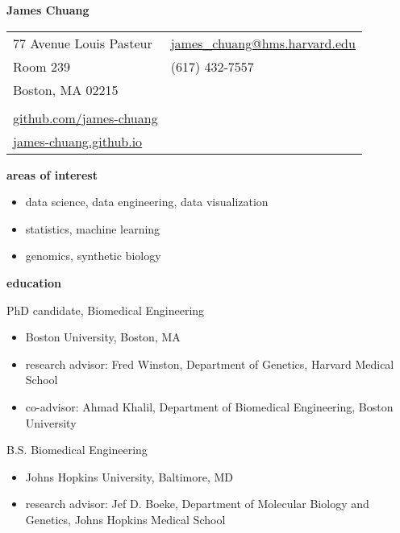 \documentclass[11pt, a4paper]{article}
\begin{document}
\textbf{\huge James Chuang}

\vspace{0.6cm}

\begin{tabularx}{13 cm}{@{}Xl}
    77 Avenue Louis Pasteur & \href{mailto:james_chuang@hms.harvard.edu}{james\_chuang@hms.harvard.edu} \\
    Room 239                & (617) 432-7557                                                            \\
    Boston, MA 02215        &                                                                           \\
    \\
    \href{https://github.com/james-chuang}{github.com/james-chuang} \\
    \href{https://james-chuang.github.io}{james-chuang.github.io} \\
\end{tabularx}

\vspace{0.8cm}
\textbf{\Large areas of interest}
\begin{itemize}[topsep=2pt, align=right, leftmargin=*, labelsep=2pt]
    \item data science, data engineering, data visualization
    \item statistics, machine learning
    \item genomics, synthetic biology
\end{itemize}

\vspace{0.8cm}
\textbf{\Large education}
\begin{description}[topsep=2pt, align=right, leftmargin=*, labelsep=0pt]
    \item [2013-present ] PhD candidate, Biomedical Engineering
        \begin{itemize}[label={}, topsep=0pt]
            \item Boston University, Boston, MA
            \item research advisor: Fred Winston, Department of Genetics, Harvard Medical School
            \item co-advisor: Ahmad Khalil, Department of Biomedical Engineering, Boston University
        \end{itemize}
    \item [2013 ] B.S. Biomedical Engineering
        \begin{itemize}[label={}, topsep=0pt]
            \item Johns Hopkins University, Baltimore, MD
            \item research advisor: Jef D. Boeke, Department of Molecular Biology and Genetics, Johns Hopkins Medical School
        \end{itemize}
\end{description}
\end{document}
